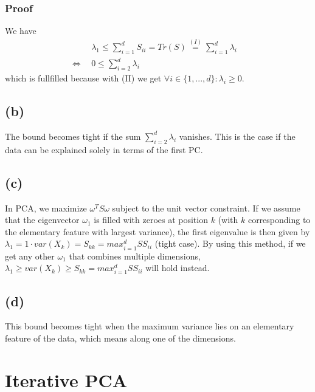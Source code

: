 \documentclass{article}
\begin{document}
\subsubsection*{Proof}
We have
\begin{align*}
&\lambda_1 \leq \sum \limits _{i=1}^d S_{ii} = Tr(S) \stackrel{(I)}{=}
\sum \limits _{i=1}^d \lambda_i& \\
\Leftrightarrow~~& 0 \leq  \sum \limits _{i=2}^d \lambda_i&
\end{align*}
which is fullfilled because with (II) we get $\forall i \in \{1,...,d\} : \lambda_i \geq 0$.

\subsection*{(b)}
The bound becomes tight if the sum $\sum_{i=2}^d \lambda_i$ vanishes. This is the case if the data can be explained solely in terms of the first PC.

\subsection*{(c)}
In PCA, we maximize $\omega^T S \omega$ subject to the unit vector constraint. If we assume that the eigenvector $\omega_1$ is filled with zeroes at position $k$ (with $k$ corresponding to the elementary feature with largest variance), the first eigenvalue is then given by $\lambda_1=1\cdot var(X_k) = S_{kk} = max_{i=1}^d SS_{ii}$ (tight case). By using this method, if we get any other $\omega_1$ that combines multiple dimensions, $\lambda_1 \geq var(X_k) \geq S_{kk} = max_{i=1}^d SS_{ii}$ will hold instead.

\subsection*{(d)}
This bound becomes tight when the maximum variance lies on an elementary feature of the data, which means along one of the dimensions.


\section{Iterative PCA}
\end{document}
